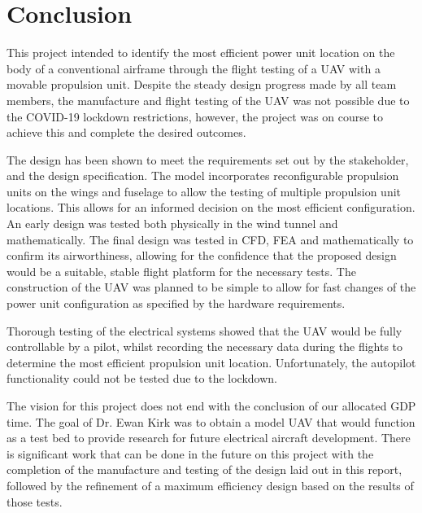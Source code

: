 \documentclass[../../main.tex]{subfiles}
\begin{document}
\chapter{Conclusion} \label{chapter:conclusion}

This project intended to identify the most efficient power unit location on the body of a conventional airframe through the flight testing of a UAV with a movable propulsion unit.
Despite the steady design progress made by all team members, the manufacture and flight testing of the UAV was not possible due to the COVID-19 lockdown restrictions, however, the project was on course to achieve this and complete the desired outcomes.  

The design has been shown to meet the requirements set out by the stakeholder, and the design specification.
The model incorporates reconfigurable propulsion units on the wings and fuselage to allow the testing of multiple propulsion unit locations.
This allows for an informed decision on the most efficient configuration.
An early design was tested both physically in the wind tunnel and mathematically.
The final design was tested in CFD, FEA and mathematically to confirm its airworthiness, allowing for the confidence that the proposed design would be a suitable, stable flight platform for the necessary tests.
The construction of the UAV was planned to be simple to allow for fast changes of the power unit configuration as specified by the hardware requirements. 

Thorough testing of the electrical systems showed that the UAV would be fully controllable by a pilot, whilst recording the necessary data during the flights to determine the most efficient propulsion unit location.
Unfortunately, the autopilot functionality could not be tested due to the lockdown.  

The vision for this project does not end with the conclusion of our allocated GDP time.
The goal of Dr. Ewan Kirk was to obtain a model UAV that would function as a test bed to provide research for future electrical aircraft development.
There is significant work that can be done in the future on this project with the completion of the manufacture and testing of the design laid out in this report, followed by the refinement of a maximum efficiency design based on the results of those tests. 
\end{document}
